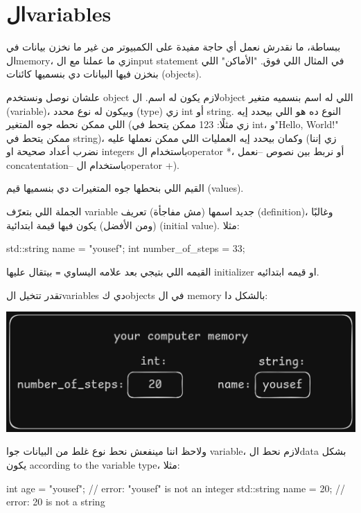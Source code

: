 \documentclass[11pt]{article}
\let\OriginalVerbatim\verbatim
\let\endOriginalVerbatim\endverbatim
\renewenvironment{verbatim}{\begin{english}\OriginalVerbatim}{\endOriginalVerbatim\end{english}}
\begin{document}
\section{الvariables}
\label{sec:org2dd7313}
ببساطة، ما نقدرش نعمل أي حاجة مفيدة على الكمبيوتر من غير ما نخزن بيانات في الmemory، زي ما عملنا مع الinput statement في المثال اللي فوق. "الأماكن" اللي بنخزن فيها البيانات دي بنسميها كائنات (objects).

علشان نوصل ونستخدم object لازم يكون له اسم. الobject اللي له اسم بنسميه متغير (variable)، وبيكون له نوع محدد (type) زي int أو string. النوع ده هو اللي بيحدد إيه اللي ممكن نحطه جوه المتغير (زي مثلًا: 123 ممكن يتحط في int، و"Hello, World!\n" ممكن يتحط في string)، وكمان بيحدد إيه العمليات اللي ممكن نعملها عليه (زي إننا نضرب أعداد صحيحة او integers باستخدام الoperator *، أو نربط بين نصوص --نعمل concatentation-- باستخدام الoperator +).

القيم اللي بنحطها جوه المتغيرات دي بنسميها قيم (values).

الجملة اللي بتعرّف variable جديد اسمها (مش مفاجأة) تعريف (definition)، وغالبًا (ومن الأفضل) يكون فيها قيمة ابتدائية (initial value). مثلا:

\begin{verbatim}
std::string name = "yousef";
int number_of_steps = 33;
\end{verbatim}

القيمه اللي بتيجي بعد علامه اليساوي \texttt{=} بيتقال عليها initializer او قيمه ابتدائيه.

تقدر تتخيل الvariables دي كobjects في ال memory بالشكل دا:

\begin{center}
\includegraphics[width=.9\linewidth]{../images/objects_in_memory.png}
\end{center}

ولاحظ اننا مينفعش نحط نوع غلط من البيانات جوا variable، لازم نحط الdata بشكل يكون according to the variable type، مثلا:

\begin{verbatim}
int age = "yousef";	    // error: "yousef" is not an integer
std::string name = 20;  // error: 20 is not a string
\end{verbatim}
\end{document}
